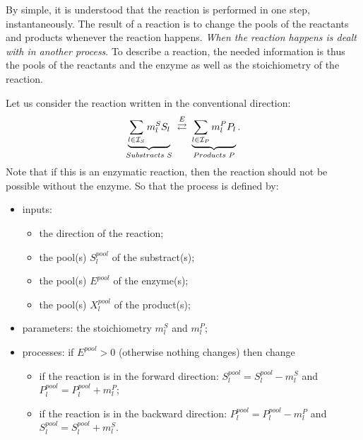 By simple, it is understood that the reaction is performed in one step, instantaneously. The result of a reaction is to change the pools of the reactants and products whenever the reaction happens. {\em When the reaction happens is dealt with in another process}. To describe a reaction, the needed information is thus the pools of the reactants and the enzyme as well as the stoichiometry of the reaction.

\medskip

Let us consider the reaction written in the conventional direction:
$$
  \reactionRev{\underbrace{\sum_{l\in \mathcal{I}_S} m_{l}^SS_{l}}_{Substracts \text{ } S}}{\underbrace{\sum_{l\in\mathcal{I}_P}m_{l}^PP_l}_{Products \text{ } P}}{E}{}.
$$
Note that if this is an enzymatic reaction, then the reaction should not be possible without the enzyme. So that the process is defined by:
\begin{itemize}
  \item inputs:
  \begin{itemize}
    \item the direction of the reaction;
    \item the pool(s) $S_l^{pool}$ of the substract(s);
    \item the pool(s) $E^{pool}$ of the enzyme(s);
    \item the pool(s) $X_l^{pool}$ of the product(s);
  \end{itemize}
  \item parameters: the stoichiometry $m_{l}^S$ and $m_{l}^P$;
  \item processes: if $E^{pool}>0$ (otherwise nothing changes) then change
  \begin{itemize}
    \item if the reaction is in the forward direction: $S_l^{pool} = S_l^{pool} - m_{l}^S$ and $P_l^{pool} = P_l^{pool} + m_{l}^P$;
    \item if the reaction is in the backward direction: $P_l^{pool} = P_l^{pool} - m_{l}^P$ and $S_l^{pool} = S_l^{pool} + m_{l}^S$.
  \end{itemize}
\end{itemize}

\medskip

